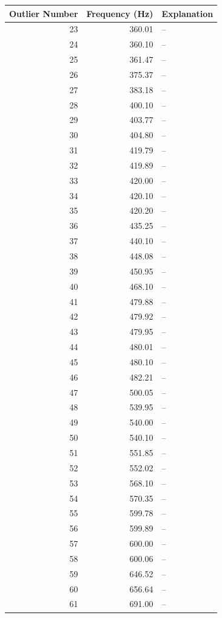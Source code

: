 \begin{table}
\begin{center}
\begin{tabular}{r r l}
Outlier Number & Frequency (Hz) & Explanation \\
\hline
23 & 360.01  & -- \\
24 & 360.10 & -- \\
25 & 361.47 & -- \\
26 & 375.37 & -- \\
27 & 383.18 & -- \\
28 & 400.10 & -- \\
29 & 403.77 & -- \\
30 & 404.80 & -- \\
31 & 419.79 & -- \\
32 & 419.89 & -- \\
33 & 420.00 & -- \\
34 & 420.10 & -- \\
35 & 420.20 & -- \\
36 & 435.25 & -- \\
37 & 440.10 & -- \\
38 & 448.08 & -- \\
39 & 450.95 & -- \\
40 & 468.10 & -- \\
41 & 479.88 & -- \\
42 & 479.92 & -- \\
43 & 479.95 & -- \\
44 & 480.01 & -- \\
45 & 480.10 & -- \\
46 & 482.21 & -- \\
47 & 500.05 & -- \\
48 & 539.95 & -- \\
49 & 540.00 & -- \\
50 & 540.10 & -- \\
51 & 551.85 & -- \\
52 & 552.02 & -- \\
53 & 568.10 & -- \\
54 & 570.35 & -- \\
55 & 599.78 & -- \\
56 & 599.89 & -- \\
57 & 600.00 & -- \\
58 & 600.06 & -- \\
59 & 646.52 & -- \\
60 & 656.64 & -- \\
61 & 691.00 & -- \\

\end{tabular}
\end{center}
\end{table}
